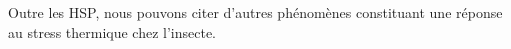 Outre les HSP, nous pouvons citer d'autres phénomènes constituant une réponse au stress thermique chez l'insecte.


